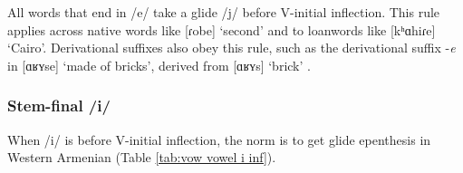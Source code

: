 {	
	\begin{table}[H]
		\centering
		\caption{Glide epenthesis between /e/ and V-initial inflection}
		\label{tab:vow vowel e inf}
		\end{table} 
	
	All words that end in /e/ take a glide /j/ before V-initial inflection. This rule applies across native words like [ɾobe] `second' and to loanwords like [kʰɑhiɾe] `Cairo'. Derivational suffixes also obey this rule, such as the derivational suffix -\textit{e} in [ɑʁʏse] `made of bricks', derived from [ɑʁʏs] `brick' . 
	
	\subsubsection{Stem-final /i/}\label{section:syllable:VowelHiatus:Inf:I}
	
	When /i/ is before V-initial inflection, the norm is to get glide epenthesis in Western Armenian (Table \ref{tab:vow vowel i inf}). 
	
}
